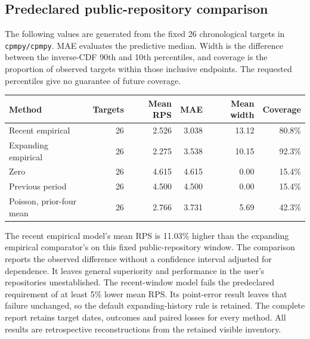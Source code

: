 \subsection{Predeclared public-repository comparison}
The following values are generated from the fixed 26 chronological targets in \texttt{cpmpy/cpmpy}. MAE evaluates the predictive median. Width is the difference between the inverse-CDF 90th and 10th percentiles, and coverage is the proportion of observed targets within those inclusive endpoints. The requested percentiles give no guarantee of future coverage.
\begin{center}
\small
\begin{tabular}{@{}lrrrrr@{}}
\toprule
Method & Targets & Mean RPS & MAE & Mean width & Coverage \\
\midrule
Recent empirical & 26 & 2.526 & 3.038 & 13.12 & 80.8\% \\
Expanding empirical & 26 & 2.275 & 3.538 & 10.15 & 92.3\% \\
Zero & 26 & 4.615 & 4.615 & 0.00 & 15.4\% \\
Previous period & 26 & 4.500 & 4.500 & 0.00 & 15.4\% \\
Poisson, prior-four mean & 26 & 2.766 & 3.731 & 5.69 & 42.3\% \\
\bottomrule
\end{tabular}
\end{center}
The recent empirical model's mean RPS is 11.03\% higher than the expanding empirical comparator's on this fixed public-repository window. The comparison reports the observed difference without a confidence interval adjusted for dependence. It leaves general superiority and performance in the user's repositories unestablished.
The recent-window model fails the predeclared requirement of at least 5\% lower mean RPS. Its point-error result leaves that failure unchanged, so the default expanding-history rule is retained.
The complete report retains target dates, outcomes and paired losses for every method. All results are retrospective reconstructions from the retained visible inventory.
